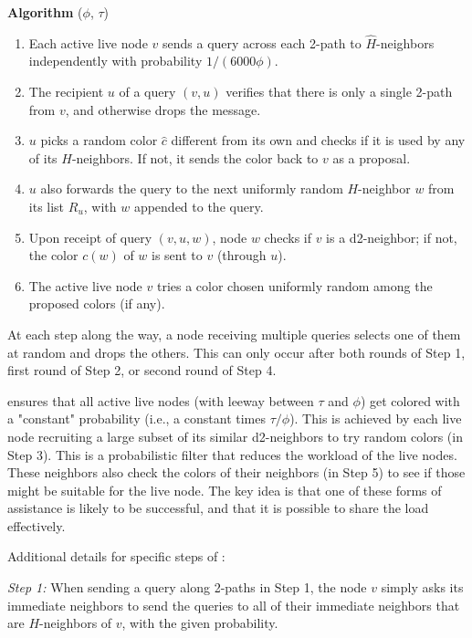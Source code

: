    \textbf{Algorithm} ($\phi$, $\tau$)
\begin{enumerate}
\itemsep 0em 
  \item Each active live node $v$ sends a query across each 2-path to $\hat{H}$-neighbors independently with probability $1/(6000\phi)$.
  \item The recipient $u$ of a query $(v,u)$ verifies that there is only a single 2-path from $v$, and otherwise drops the message.
  \item $u$ picks a random color $\hat{c}$ different from its own and checks if it is used by any of its $H$-neighbors. If not, it sends the color back to $v$ as a proposal.
  \item $u$ also forwards the query to the next uniformly random $H$-neighbor $w$ from its list $R_u$, with $w$ appended to the query.
  \item Upon receipt of query $(v,u,w)$, node $w$ checks if $v$ is a d2-neighbor; if not, the color $c(w)$ of $w$ is sent to $v$ (through $u$).
  \item The active live node $v$ tries a color chosen uniformly random among the proposed colors (if any).
  \end{enumerate}
At each step along the way, a node receiving multiple queries selects one of them at random and drops the others. This can only occur after both rounds of Step 1, first round of Step 2, or second round of Step 4.

 ensures that all active live nodes (with leeway between $\tau$ and $\phi$) get colored with a "constant" probability (i.e., a constant times $\tau/\phi$). This is achieved by each live node recruiting a large subset of its similar d2-neighbors to try random colors (in Step 3). This is a probabilistic filter that reduces the workload of the live nodes. These neighbors also check the colors of their neighbors (in Step 5) to see if those might be suitable for the live node. The key idea is that one of these forms of assistance is likely to be successful, and that it is possible to share the load effectively.

%
Additional details for specific steps of :

\emph{Step 1:}
When sending a query along 2-paths in Step 1, the node $v$ simply asks its immediate neighbors to send the queries to all of their immediate neighbors that are $H$-neighbors of $v$, with the given probability.

